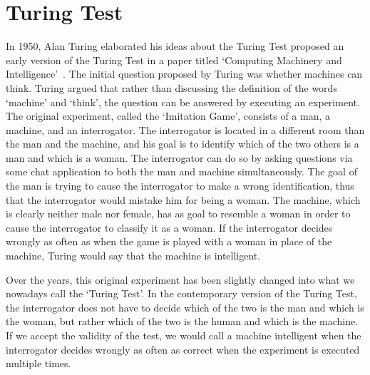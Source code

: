 \section{Turing Test}
In 1950, Alan Turing elaborated his ideas about the Turing Test proposed an early version of the Turing Test in a paper titled ‘Computing Machinery and Intelligence’~\cite{turing1950computing}. The initial question proposed by Turing was whether machines can think. Turing argued that rather than discussing the definition of the words ‘machine’ and ‘think’, the question can be answered by executing an experiment. The original experiment, called the ‘Imitation Game’, consists of a man, a machine, and an interrogator. The interrogator is located in a different room than the man and the machine, and his goal is to identify which of the two others is a man and which is a woman. The interrogator can do so by asking questions via some chat application to both the man and machine simultaneously. The goal of the man is trying to cause the interrogator to make a wrong identification, thus that the interrogator would mistake him for being a woman. The machine, which is clearly neither male nor female, has as goal to resemble a woman in order to cause the interrogator to classify it as a woman. If the interrogator decides wrongly as often as when the game is played with a woman in place of the machine, Turing would say that the machine is intelligent.

Over the years, this original experiment has been slightly changed into what we nowadays call the ‘Turing Test’. In the contemporary version of the Turing Test, the interrogator does not have to decide which of the two is the man and which is the woman, but rather which of the two is the human and which is the machine. If we accept the validity of the test, we would call a machine intelligent when the interrogator decides wrongly as often as correct when the experiment is executed multiple times.
